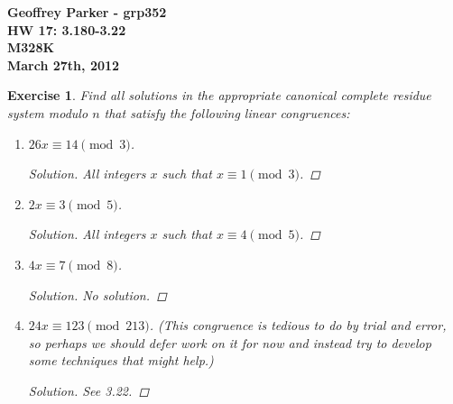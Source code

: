 \documentclass[12pt,leqno]{article}
\numberwithin{equation}{section}
\newtheorem{exer}[thm]{Exercise}
\theoremstyle{definition}
\begin{document}
\thispagestyle{plain}
\begin{flushright}
\large{\textbf{Geoffrey Parker - grp352 \\
HW 17: 3.180-3.22\\
M328K \\
March 27th, 2012 \\}}
\end{flushright}

\markboth{}{} \setcounter{section}{0} \baselineskip=18pt

\setcounter{tocdepth}{4}



\setcounter{section}{3}

\setcounter{thm}{17}

\begin{exer}
Find all solutions in the appropriate canonical complete residue
system modulo $n$ that satisfy the following linear congruences:
\begin{enumerate}
\item $26x \equiv 14 \pmod{3}$.
\begin{proof}[Solution]
All integers $x$ such that $x \equiv 1 \pmod{3}$.
\end{proof}
\item $2x \equiv 3 \pmod{5}$.
\begin{proof}[Solution]
All integers $x$ such that $x \equiv 4 \pmod{5}$.
\end{proof}
\item $4x \equiv 7 \pmod{8}$.
\begin{proof}[Solution]
No solution.
\end{proof}
\item $24x \equiv 123 \pmod{213}$. (This congruence is tedious to do by
trial and error, so perhaps we should defer work on it for now and
instead try to develop some techniques that might help.)
\begin{proof}[Solution]
See 3.22.
\end{proof}
\end{enumerate}
\end{exer}
\end{document}
